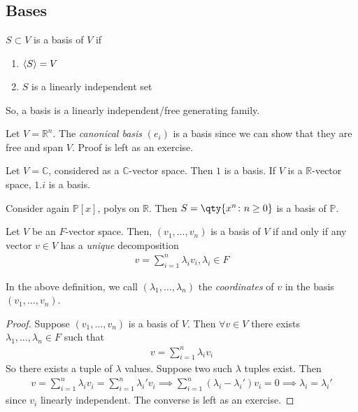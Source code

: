     \subsection{Bases}
    \begin{definition}[Basis]
        $S \subset V$ is a basis of $V$ if
        \begin{enumerate}
            \item $\langle{} S \rangle = V$
            \item $S$ is a linearly independent set
        \end{enumerate}
        So, a basis is a linearly independent/free generating family.
    \end{definition}
    \begin{example}
        Let $V = \mathbb R^n$.
        The \textit{canonical basis} $(e_i)$ is a basis since we can show that they are free and span $V$.
        Proof is left as an exercise.
    \end{example}
    \begin{example}
        Let $V = \mathbb C$, considered as a $\mathbb C$-vector space.
        Then $\qty{1}$ is a basis.
        If $V$ is a $\mathbb R$-vector space, $\qty{1,i}$ is a basis.
    \end{example}
    \begin{example}
        Consider again $\mathbb P[x]$, polys on $\mathbb{R}$.
        Then $S = \qty{x^n \colon n \geq 0}$ is a basis of $\mathbb P$.
    \end{example}
    
    \begin{lemma}
        Let $V$ be an $F$-vector space.
        Then, $(v_1, \dots, v_n)$ is a basis of $V$ if and only if any vector $v \in V$ has a \textit{unique} decomposition
        \begin{align*}
            v = \sum_{i=1}^n \lambda_i v_i, \lambda_i \in F
        \end{align*}
    \end{lemma}
    \begin{remark}
        In the above definition, we call $(\lambda_1, \dots, \lambda_n)$ the \textit{coordinates} of $v$ in the basis $(v_1, \dots, v_n)$.
    \end{remark}
    \begin{proof}
        Suppose $(v_1, \dots, v_n)$ is a basis of $V$.
        Then $\forall v \in V$ there exists $\lambda_1, \dots, \lambda_n \in F$ such that
        \begin{align*}
            v = \sum_{i=1}^n \lambda_i v_i
        \end{align*}
        So there exists a tuple of $\lambda$ values.
        Suppose two such $\lambda$ tuples exist.
        Then
        \begin{align*}
            v = \sum_{i=1}^n \lambda_i v_i = \sum_{i=1}^n \lambda_i' v_i \implies \sum_{i=1}^n (\lambda_i - \lambda_i') v_i = 0 \implies \lambda_i = \lambda_i'
        \end{align*} since $v_i$ linearly independent.
        The converse is left as an exercise.
    \end{proof}

